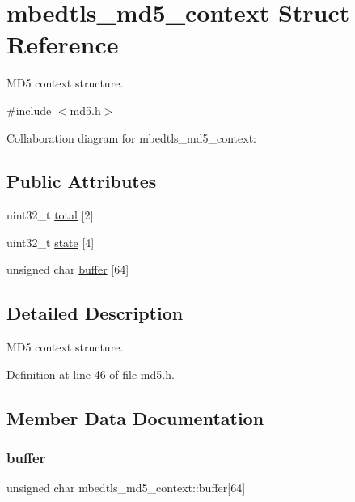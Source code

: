 \hypertarget{structmbedtls__md5__context}{}\section{mbedtls\+\_\+md5\+\_\+context Struct Reference}
\label{structmbedtls__md5__context}


M\+D5 context structure.  




{\ttfamily \#include $<$md5.\+h$>$}



Collaboration diagram for mbedtls\+\_\+md5\+\_\+context\+:
\subsection*{Public Attributes}
\begin{DoxyCompactItemize}
\item 
uint32\+\_\+t \mbox{\hyperlink{structmbedtls__md5__context_a69e02fc353b932fe9f58fcae64506c6e}{total}} \mbox{[}2\mbox{]}
\item 
uint32\+\_\+t \mbox{\hyperlink{structmbedtls__md5__context_a17e9e7e1ab79b648e787969ee5b73929}{state}} \mbox{[}4\mbox{]}
\item 
unsigned char \mbox{\hyperlink{structmbedtls__md5__context_a456c4c1c0f77e12f5091e7fb7ecbb476}{buffer}} \mbox{[}64\mbox{]}
\end{DoxyCompactItemize}


\subsection{Detailed Description}
M\+D5 context structure. 

Definition at line 46 of file md5.\+h.



\subsection{Member Data Documentation}
\mbox{\label{structmbedtls__md5__context_a456c4c1c0f77e12f5091e7fb7ecbb476}} 
\subsubsection{\texorpdfstring{buffer}{buffer}}
{\footnotesize\ttfamily unsigned char mbedtls\+\_\+md5\+\_\+context\+::buffer\mbox{[}64\mbox{]}}

